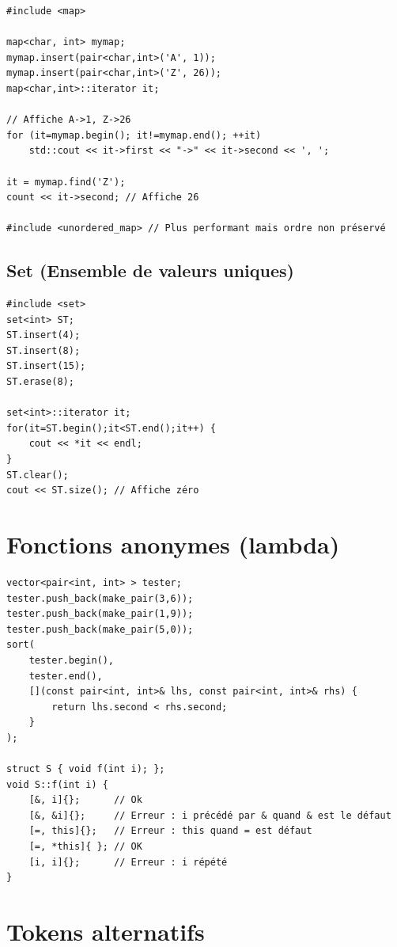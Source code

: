 \documentclass{article}
\begin{document}
\begin{multicols*}{3}
    \begin{lstlisting}
#include <map>

map<char, int> mymap;
mymap.insert(pair<char,int>('A', 1));
mymap.insert(pair<char,int>('Z', 26));
map<char,int>::iterator it;

// Affiche A->1, Z->26
for (it=mymap.begin(); it!=mymap.end(); ++it)
    std::cout << it->first << "->" << it->second << ', ';

it = mymap.find('Z');
count << it->second; // Affiche 26

#include <unordered_map> // Plus performant mais ordre non préservé

\end{lstlisting}

    \subsection*{Set (Ensemble de valeurs uniques)}

    \begin{lstlisting}
#include <set>
set<int> ST;
ST.insert(4);
ST.insert(8);
ST.insert(15);
ST.erase(8);

set<int>::iterator it;
for(it=ST.begin();it<ST.end();it++) {
    cout << *it << endl;
}
ST.clear();
cout << ST.size(); // Affiche zéro

\end{lstlisting}

    \section*{Fonctions anonymes (lambda)}

    \begin{lstlisting}
vector<pair<int, int> > tester;
tester.push_back(make_pair(3,6));
tester.push_back(make_pair(1,9));
tester.push_back(make_pair(5,0));
sort(
    tester.begin(),
    tester.end(),
    [](const pair<int, int>& lhs, const pair<int, int>& rhs) {
        return lhs.second < rhs.second;
    }
);

struct S { void f(int i); };
void S::f(int i) {
    [&, i]{};      // Ok
    [&, &i]{};     // Erreur : i précédé par & quand & est le défaut
    [=, this]{};   // Erreur : this quand = est défaut
    [=, *this]{ }; // OK
    [i, i]{};      // Erreur : i répété
}
\end{lstlisting}

    \section*{Tokens alternatifs}


\end{multicols*}
\end{document}

